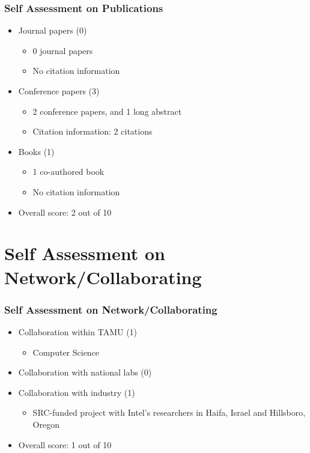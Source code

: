 \documentclass[xcolor={usenames,dvipsnames},hyperref={hyperindex,bookmarks}]{beamer}
\begin{document}
\frame
{
	\frametitle{Self Assessment on Publications}

	\begin{itemize} %
	\item Journal papers (0) %
		\begin{itemize} %
		\item 0 journal papers
		\item No citation information
		\end{itemize}
	\item Conference papers (3)
		\begin{itemize}
		\item 2 conference papers, and 1 long abstract
		\item Citation information: 2 citations
		\end{itemize}
	\item Books (1)
		\begin{itemize}
		\item 1 co-authored book
		\item No citation information
		\end{itemize}
	\item Overall score: 2 out of 10
	\end{itemize}
}







\section{Self Assessment on Network/Collaborating}

\frame
{
	\frametitle{Self Assessment on Network/Collaborating}

	\begin{itemize} %
	\item Collaboration within TAMU (1) %
		\begin{itemize} %
		\item Computer Science
		\end{itemize}
	\item Collaboration with national labs (0)
	\item Collaboration with industry (1)
		\begin{itemize}
		\item SRC-funded project with Intel's researchers in Haifa, Israel and Hillsboro, Oregon
		\end{itemize}
	\item Overall score: 1 out of 10
	\end{itemize}
}
\end{document}
